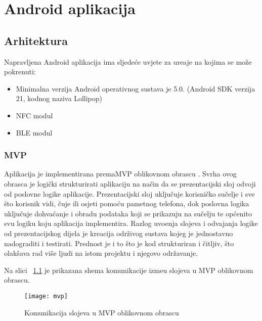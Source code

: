 
\chapter{Android aplikacija}

\section{Arhitektura}

Napravljena Android aplikacija ima sljede\'{c}e uvjete za ure\dj aje na kojima se mo\v{z}e pokrenuti:

\begin{itemize}
		\item Minimalna verzija Android operativnog sustava je 5.0. (Android SDK verzija 21, kodnog naziva Lollipop)
		\item NFC modul
		\item BLE modul
\end{itemize}

\subsection{MVP}

Aplikacija je implementirana premaMVP oblikovnom obrascu \cite{mvp}. Svrha ovog obrasca je logi\v{c}ki strukturirati aplikaciju na na\v{c}in da se prezentacijski sloj odvoji od poslovne logike aplikacije. Prezentacijski sloj uklju\v{c}uje korisni\v{c}ko su\v{c}elje i sve \v{s}to korisnik vidi, \v{c}uje ili osjeti pomo\'{c}u pametnog telefona, dok poslovna logika uklju\v{c}uje dohva\'{c}anje i obradu podataka koji se prikazuju na su\v{c}elju te op\'{c}enito svu logiku koju aplikacija implementira. Razlog uvo\dj enja slojeva i odvajanja logike od prezentacijskog dijela je kreacija odr\v{z}ivog sustava kojeg je jednostavno nadograditi i testirati. Prednost je i to \v{s}to je kod strukturiran i \v{c}itljiv, \v{s}to olak\v{s}ava rad vi\v{s}e ljudi na istom projektu i njegovo odr\v{z}avanje.

Na slici ~\ref{fig:mvp} je prikazana shema komunikacije izme\dj u slojeva u MVP oblikovnom obrascu.

\begin{figure}[!htbp]
	\begin{center}
 \texttt{[image: mvp]}
 \caption{Komunikacija slojeva u MVP oblikovnom obrascu}
 \label{fig:mvp}
	\end{center}
\end{figure}

